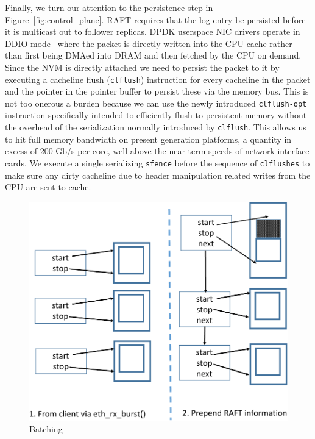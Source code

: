 \documentclass[pageno]{jpaper}
\begin{document}
Finally, we turn our attention to the persistence step in
Figure~\ref{fig:control_plane}. RAFT requires that the log entry be persisted
before it is multicast out to follower replicas. DPDK userspace NIC drivers
operate in DDIO mode~\cite{ddio} where the packet is directly written into the
CPU cache rather than first being DMAed into DRAM and then fetched by the CPU on
demand. Since the NVM is directly attached we need to persist the packet to it
by executing a cacheline flush ({\tt clflush}) instruction for every cacheline
in the packet and the pointer in the pointer buffer to persist these via the
memory bus. This is not too onerous a burden because we can use the newly
introduced {\tt clflush-opt}~\cite{clflush_opt} instruction specifically
intended to efficiently flush to persistent memory without the overhead of the
serialization normally introduced by {\tt clflush}. This allows us to hit full
memory bandwidth on present generation platforms, a quantity in excess of 200
Gb/s per core, well above the near term speeds of network interface cards. We
execute a single serializing {\tt sfence} before the sequence of {\tt clflushes}
to make sure any dirty cacheline due to header manipulation related writes from
the CPU are sent to cache.

\begin{figure}
  \centering
  \includegraphics[scale=0.4]{figures2/batching.pdf}
  \caption{Batching}
  \label{fig:batching}
\end{figure}
\end{document}
